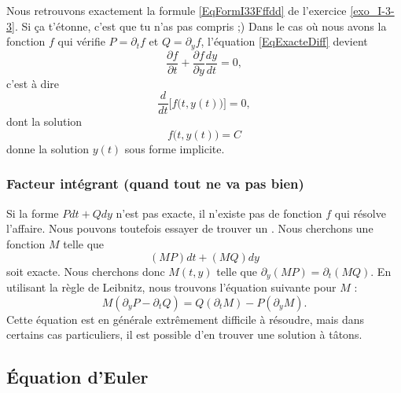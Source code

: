 Nous retrouvons exactement la formule \eqref{EqFormI33Fffdd} de l'exercice \ref{exo_I-3-3}. Si ça t'étonne, c'est que tu n'as pas compris ;) Dans le cas où nous avons la fonction $f$ qui vérifie $P=\partial_tf$ et $Q=\partial_yf$, l'équation \eqref{EqExacteDiff} devient
\begin{equation}
	\frac{ \partial f }{ \partial t }+\frac{ \partial f }{ \partial y }\frac{ dy }{ dt }=0,
\end{equation}
c'est à dire 
\begin{equation}
	\frac{ d }{ dt }\Big[ f\big( t,y(t) \big) \Big]=0,
\end{equation}
dont la solution
\begin{equation}
	f\big( t,y(t) \big)=C
\end{equation}
donne la solution $y(t)$ sous forme implicite.

					\subsubsection{Facteur intégrant (quand tout ne va pas bien)}

Si la forme $Pdt+Qdy$ n'est pas exacte, il n'existe pas de fonction $f$ qui résolve l'affaire. Nous pouvons toutefois essayer de trouver un . Nous cherchons une fonction $M$ telle que
\begin{equation}
	(MP)dt+(MQ)dy
\end{equation}
soit exacte. Nous cherchons donc $M(t,y)$ telle que $\partial_y(MP)=\partial_t(MQ)$. En utilisant la règle de Leibnitz, nous trouvons l'équation suivante pour $M$ :
\begin{equation}		\label{EqDuFacteurIntegrant}
	M(\partial_yP-\partial_tQ)=Q(\partial_tM)-P(\partial_yM).
\end{equation}
Cette équation est en générale extrêmement difficile à résoudre, mais dans certains cas particuliers, il est possible d'en trouver une solution à tâtons.


					\subsection{Équation d'Euler}

